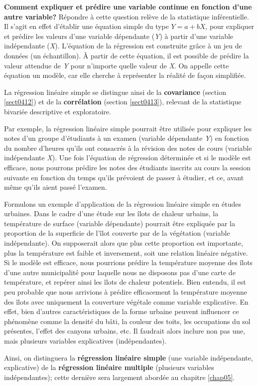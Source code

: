 \documentclass[
  11pt,
  french,
]{book}
\makeatletter
\newenvironment{kframev}{%
\medskip{}
\setlength{\fboxsep}{.8em}
 \def\at@end@of@kframev{}%
 \ifinner\ifhmode%
  \def\at@end@of@kframev{\end{minipage}}%
  \begin{minipage}{\columnwidth}%
 \fi\fi%
 \def\FrameCommand##1{\hskip\@totalleftmargin \hskip-\fboxsep
 \colorbox{shadebluecolor}{##1}\hskip-\fboxsep
     \hskip-\linewidth \hskip-\@totalleftmargin \hskip\columnwidth}%
 \MakeFramed {\advance\hsize-\width
   \@totalleftmargin\z@ \linewidth\hsize
   \@setminipage}}%
 {\par\unskip\endMakeFramed%
 \at@end@of@kframev}
\newenvironment{rmdblock}[1]
  {
  \begin{itemize}
  \renewcommand{\labelitemi}{
    \raisebox{-.7\height}[0pt][0pt]{
      {\setkeys{Gin}{width=3em,keepaspectratio}\texttt{[image: images/\#1]}}
    }
  }
  \setlength{\fboxsep}{1em}
  \begin{kframev}
  \small
  \item
  }
  {
  \end{kframev}
  \end{itemize}
  }
\newenvironment{bloc_objectif}
  {\begin{rmdblock}{objectif}}
  {\end{rmdblock}}
\makeatother
\begin{document}
\begin{bloc_objectif}

\textbf{Comment expliquer et prédire une variable continue en fonction d'une autre variable?} Répondre à cette question relève de la statistique inférentielle. Il s'agit en effet d'établir une équation simple du type \(Y = a + bX\), pour expliquer et prédire les valeurs d'une variable dépendante (\emph{Y}) à partir d'une variable indépendante (\emph{X}). L'équation de la régression est construite grâce à un jeu de données (un échantillon). À partir de cette équation, il est possible de prédire la valeur attendue de \emph{Y} pour n'importe quelle valeur de \emph{X}. On appelle cette équation un modèle, car elle cherche à représenter la réalité de façon simplifiée.

La régression linéaire simple se distingue ainsi de la \textbf{covariance} (section \ref{sect0412}) et de la \textbf{corrélation} (section \ref{sect0413}), relevant de la statistique bivariée descriptive et exploratoire.

Par exemple, la régression linéaire simple pourrait être utilisée pour expliquer les notes d'un groupe d'étudiants à un examen (variable dépendante \emph{Y}) en fonction du nombre d'heures qu'ils ont consacrés à la révision des notes de cours (variable indépendante \emph{X}). Une fois l'équation de régression déterminée et si le modèle est efficace, nous pourrons prédire les notes des étudiants inscrits au cours la session suivante en fonction du temps qu'ils prévoient de passer à étudier, et ce, avant même qu'ils aient passé l'examen.

Formulons un exemple d'application de la régression linéaire simple en études urbaines. Dans le cadre d'une étude sur les îlots de chaleur urbains, la température de surface (variable dépendante) pourrait être expliquée par la proportion de la superficie de l'îlot couverte par de la végétation (variable indépendante). On supposerait alors que plus cette proportion est importante, plus la température est faible et inversement, soit une relation linéaire négative. Si le modèle est efficace, nous pourrions prédire la température moyenne des îlots d'une autre municipalité pour laquelle nous ne disposons pas d'une carte de température, et repérer ainsi les îlots de chaleur potentiels. Bien entendu, il est peu probable que nous arrivions à prédire efficacement la température moyenne des îlots avec uniquement la couverture végétale comme variable explicative. En effet, bien d'autres caractéristiques de la forme urbaine peuvent influencer ce phénomène comme la densité du bâti, la couleur des toits, les occupations du sol présentes, l'effet des canyons urbains, etc. Il faudrait alors inclure non pas une, mais plusieurs variables explicatives (indépendantes).

Ainsi, on distinguera la \textbf{régression linéaire simple} (une variable indépendante, explicative) de la \textbf{régression linéaire multiple} (plusieurs variables indépendantes); cette dernière sera largement abordée au chapitre \ref{chap05}.

\end{bloc_objectif}
\end{document}
